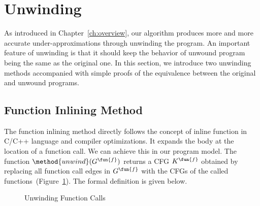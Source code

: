 
\section{Unwinding}\label{sec:unwinding}
As introduced in Chapter~\ref{ch:overview}, our algorithm produces more and more
accurate under-approximations through unwinding the program.
An important feature of unwinding is that it should keep the behavior of unwound
program being the same as the original one.
In this section, we introduce two unwinding methods accompanied with simple 
proofs of the equivalence between the original and unwound programs.

\subsection{Function Inlining Method}\label{subsec:inlining}
The function inlining method directly follows the concept of inline function in
C/C++ language and compiler optimizations.
It expands the body at the location of a function call.
We can achieve this in our program model.
The function $\method{unwind}(G^\fun{f})$ returns a CFG $K^\fun{f}$
obtained by replacing all function call edges in $G^\fun{f}$ with the CFGs of
the called functions~(Figure~\ref{figure:unwinding}).
The formal definition is given below.

\begin{figure}[t]
  \centering

  \caption{Unwinding Function Calls}
  \label{figure:unwinding}
\end{figure}

